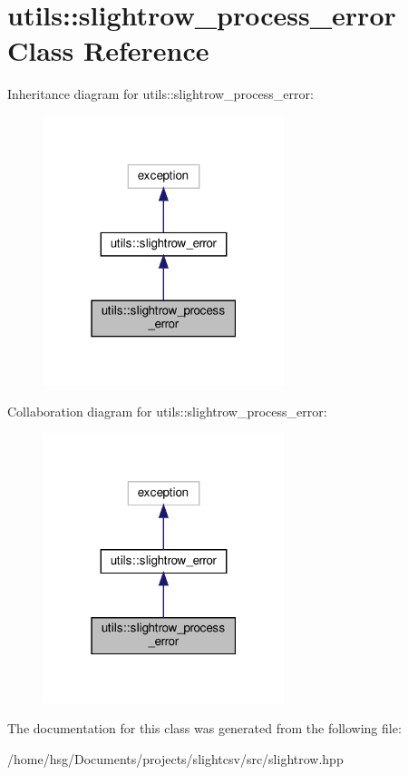 \hypertarget{classutils_1_1slightrow__process__error}{}\section{utils\+:\+:slightrow\+\_\+process\+\_\+error Class Reference}
\label{classutils_1_1slightrow__process__error}


Inheritance diagram for utils\+:\+:slightrow\+\_\+process\+\_\+error\+:\nopagebreak
\begin{figure}[H]
\begin{center}
\leavevmode
\includegraphics[width=199pt]{classutils_1_1slightrow__process__error__inherit__graph}
\end{center}
\end{figure}


Collaboration diagram for utils\+:\+:slightrow\+\_\+process\+\_\+error\+:\nopagebreak
\begin{figure}[H]
\begin{center}
\leavevmode
\includegraphics[width=199pt]{classutils_1_1slightrow__process__error__coll__graph}
\end{center}
\end{figure}


The documentation for this class was generated from the following file\+:\begin{DoxyCompactItemize}
\item 
/home/hsg/\+Documents/projects/slightcsv/src/slightrow.\+hpp\end{DoxyCompactItemize}
